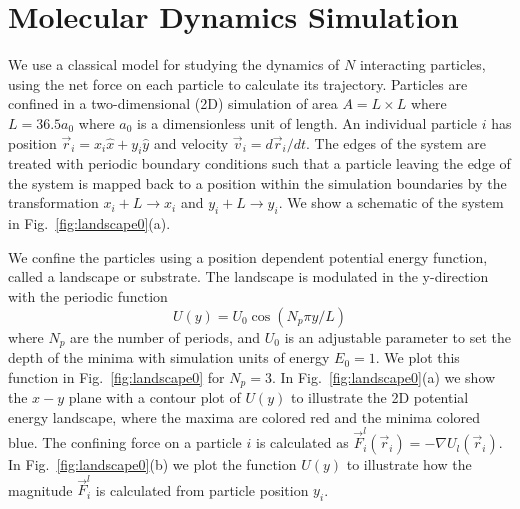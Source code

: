 \documentclass[twocolumn,preprintnumbers,amsmath,amssymb,aps,prx]{revtex4}
\begin{document}

\section{Molecular Dynamics Simulation}
\label{sec:MD}

We use a classical model for 
studying the dynamics of $N$ interacting particles,
using the net force on each particle to calculate
its trajectory.
Particles are confined in a two-dimensional (2D) 
simulation of area $A = L \times L$ where $L=36.5 a_0$
where $a_0$ is a dimensionless unit of length.
An individual particle $i$ has
position $\vec{r}_i = x_i \hat{x} + y_i \hat{y}$
and velocity $\vec{v}_i = d\vec{r}_i/dt$.
The edges of the system are treated with
periodic boundary conditions
such that a particle leaving the edge of the system is mapped
back to a position within the simulation boundaries 
by the transformation $x_i+L \rightarrow x_i$ and $y_i+L \rightarrow y_i$.
We show a schematic of the system in Fig.~\ref{fig:landscape0}(a).

We confine the particles using a position dependent 
potential energy function, called a landscape or substrate.
% 
The landscape is modulated in the y-direction
with the periodic function 
 \begin{equation}
   U(y) = U_0 \cos{(N_p \pi y / L)}
     \label{eq:ysubstrate}
\end{equation}
 where $N_p$ are the number of periods,
 and $U_0$ is an adjustable parameter
 to set the depth of the minima
 with simulation units of energy $E_0 = 1$. 
 We plot this function in 
 Fig.~\ref{fig:landscape0}
 for $N_p = 3$. %
 In Fig.~\ref{fig:landscape0}(a) we show 
 the $x-y$ plane with a contour plot of $U(y)$ %
 to illustrate
 the 2D potential energy landscape,
 where 
 the maxima are colored red and the minima colored blue.
 The confining force on a particle $i$
 is calculated as 
 $\vec{F}^{l}_i(\vec{r}_i) = -\nabla U_l(\vec{r}_i)$.
 In Fig.~\ref{fig:landscape0}(b) we plot the function
 $U(y)$ to illustrate how the magnitude
 $\vec{F}^{l}_i$ is calculated from particle position $y_i$.  
 
\end{document}
